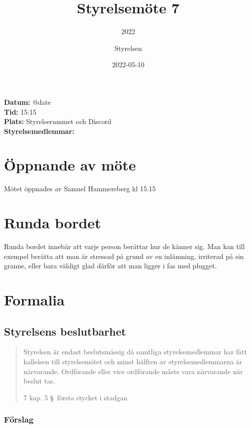 \documentclass[protokoll]{dvd}
\begin{document}
\title{Styrelsemöte 7}
\subtitle{2022}
\author{Styrelsen}
\date{2022-05-10}

\textbf{Datum:} \csname @date\endcsname\\
\textbf{Tid:} 15:15\\
\textbf{Plats:} Styrelserummet och Discord\\
\textbf{Styrelsemedlemmar:}
\begin{närvarande_förtroendevalda}
\end{närvarande_förtroendevalda}


\section{Öppnande av möte}

Mötet öppnades av Samuel Hammersberg kl 15.15

\section{Runda bordet}

Runda bordet innebär att varje person berättar hur de känner sig.
Man kan till exempel berätta att man är stressad på grund av en inlämning, irriterad på sin granne, eller bara väldigt glad därför att man ligger i fas med plugget.

\section{Formalia}

\subsection{Styrelsens beslutbarhet}

\blockquote[7 kap. 5 \S~första stycket i stadgan][]{%
    Styrelsen är endast beslutsmässig då samtliga styrelsemedlemmar har fått kallelsen till styrelsemötet och minst hälften av styrelsemedlemmarna är närvarande.
    Ordförande eller vice ordförande måste vara närvarande när beslut tas.
}

\subsubsection*{Förslag}
\end{document}
